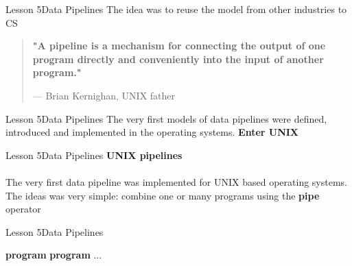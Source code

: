 \documentclass[aspectratio=1610]{beamer}
\begin{document}
\begin{frame}
\end{frame}



\begin{frame}{Lesson 5}{Data Pipelines}
\Huge
 The idea was to reuse the model from other industries to CS
 \end{frame}


\begin{frame}
\begin{center}
\Huge
\begin{quote}
\textbf{"A pipeline is a mechanism for connecting the output of one program directly and conveniently into the 
    input of another program."}
\begin{flushright}
{--- Brian Kernighan, UNIX father}	
\end{flushright}
\end{quote}
\end{center}
\end{frame}


\begin{frame}{Lesson 5}{Data Pipelines}
\Huge
 The very first models of data pipelines were defined, introduced and 
 implemented in the operating systems. \textbf{Enter UNIX}
 \end{frame}




\begin{frame}{Lesson 5}{Data Pipelines}
\LARGE
\textbf{UNIX pipelines}\\~\\
The very first data pipeline was implemented for UNIX based operating
systems. The ideas was very simple: combine one or many programs 
using the \textbf{pipe} operator \text{\textbar}
\end{frame}


\begin{frame}{Lesson 5}{Data Pipelines}
\Huge
\begin{center}
\textbf{program} \text{\textbar} \textbf{program} \text{\textbar} ... 
\end{center}
\end{frame}



\begin{frame}
\end{frame}
\end{document}
